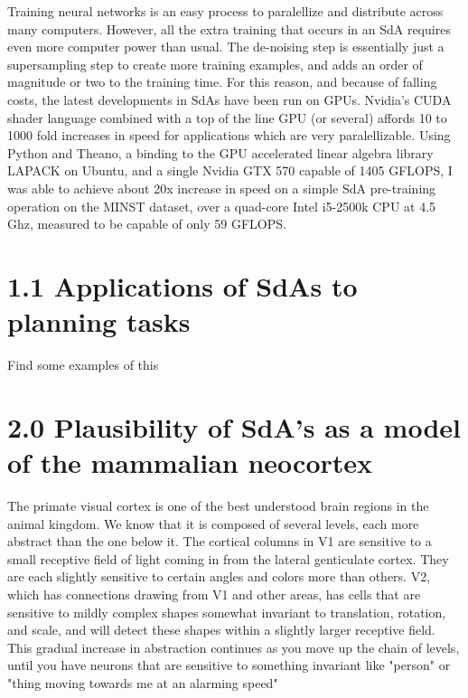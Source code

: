 \documentclass[11pt]{article}
\begin{document}
Training neural networks is an easy process to paralellize and distribute across many computers. However, all the extra training that occurs in an SdA requires even more computer power than usual. The de-noising step is essentially just a supersampling step to create more training examples, and adds an order of magnitude or two to the training time. For this reason, and because of falling costs, the latest developments in SdAs have been run on GPUs. Nvidia's CUDA shader language combined with a top of the line GPU (or several) affords 10 to 1000 fold increases in speed for applications which are very paralellizable. Using Python and Theano, a binding to the GPU accelerated linear algebra library LAPACK on Ubuntu, and a single Nvidia GTX 570 capable of 1405 GFLOPS, I was able to achieve about 20x increase in speed on a simple SdA pre-training operation on the MINST dataset, over a quad-core Intel i5-2500k CPU at 4.5 Ghz, measured to be capable of only 59 GFLOPS.

\section{1.1 Applications of SdAs to planning tasks}
\label{Applications of SdAs to planning tasks}

Find some examples of this

\section{2.0 Plausibility of SdA's as a model of the mammalian neocortex}
\label{Plausibility of SdA's as a model of the mammalian neocortex}

The primate visual cortex is one of the best understood brain regions in the animal kingdom. We know that it is composed of several levels, each more abstract than the one below it. The cortical columns in V1 are sensitive to a small receptive field of light coming in from the lateral genticulate cortex. They are each slightly sensitive to certain angles and colors more than others. V2, which has connections drawing from V1 and other areas, has cells that are sensitive to mildly complex shapes somewhat invariant to translation, rotation, and scale, and will detect these shapes within a slightly larger receptive field. This gradual increase in abstraction continues as you move up the chain of levels, until you have neurons that are sensitive to something invariant like "person" or "thing moving towards me at an alarming speed"
\end{document}
